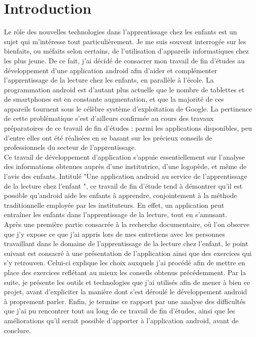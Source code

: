 \section{Introduction}
Le rôle des nouvelles technologies dans l'apprentissage chez les enfants est un sujet qui m'intéresse tout particulièrement. Je me suis souvent interrogée sur les bienfaits, ou méfaits selon certains, de l'utilisation d'appareils informatiques chez les plus jeune. De ce fait, j'ai décidé de consacrer mon travail de fin d'études au développement d'une application android afin d'aider et complémenter l'apprentissage de la lecture chez les enfants, en parallèle à l'école. La programmation android est d'autant plus actuelle que le nombre de tablettes et de smartphones est en constante augmentation, et que la majorité de ces appareils tournent sous le célèbre système d'exploitation de Google. La pertinence de cette problématique s'est d'ailleurs confirmée au cours des travaux préparatoires de ce travail de fin d'études : parmi les applications disponibles, peu d'entre elles ont été réalisées en se basant sur les précieux conseils de professionnels du secteur de l'apprentissage.\\

Ce travail de développement d'application s'appuie essentiellement sur l'analyse des informations obtenues auprès d'une institutrice, d'une logopède, et même de l'avis des enfants. Intitulé "Une application android au service de l'apprentissage de la lecture chez l'enfant ", ce travail de fin d'étude tend à démontrer qu'il est possible qu'android aide les enfants à apprendre, conjointement à la méthode traditionnelle employée par les instituteurs. En effet, un application peut entraîner les enfants dans l'apprentissage de la lecture, tout en s'amusant.\\

Après une première partie consacrée à la recherche documentaire, où l'on observe que j'y expose ce que j'ai appris lors de mes entretiens avec les personnes travaillant dans le domaine de l'apprentissage de la lecture chez l'enfant, le point suivant est consacré à une présentation de l'application ainsi que des exercices qui s'y retrouven. Celui-ci explique les choix auxquels j'ai procédé afin de mettre en place des exercices reflétant au mieux les conseils obtenus précédemment. Par la suite, je présente les outils et technologies que j'ai utilisés afin de mener à bien ce projet, avant d'expliciter la manière dont s'est déroulé le développement android à proprement parler. Enfin, je termine ce rapport par une analyse des difficultés que j'ai pu rencontrer tout au long de ce travail de fin d'études, ainsi que les améliorations qu'il serait possible d'apporter à l'application android, avant de conclure.